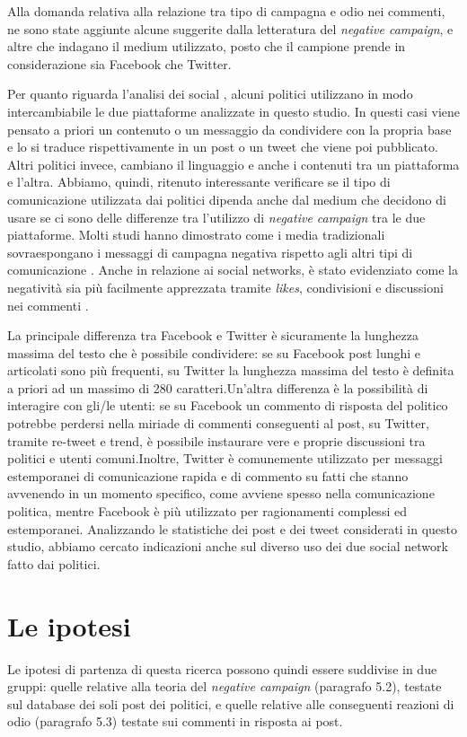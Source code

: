 Alla domanda relativa alla relazione tra tipo di campagna e odio nei commenti, ne sono state aggiunte alcune  suggerite dalla  letteratura del \textit{negative campaign}, e altre che indagano il  medium utilizzato, posto che il campione prende in considerazione sia Facebook che Twitter.

Per quanto riguarda l’analisi dei social , alcuni politici utilizzano in modo intercambiabile le due piattaforme analizzate in questo studio. In questi casi viene pensato a priori un contenuto o un messaggio da condividere con la propria base e lo si traduce rispettivamente in un post o un tweet che viene poi pubblicato. Altri politici invece, cambiano il linguaggio e anche i contenuti tra un piattaforma e l'altra. Abbiamo, quindi,  ritenuto interessante verificare se  il tipo di comunicazione utilizzata dai politici dipenda anche dal medium che decidono di usare se ci sono delle differenze tra l'utilizzo di \textit{negative campaign} tra le due piattaforme. Molti studi hanno dimostrato come i media tradizionali sovraespongano i messaggi di campagna negativa rispetto agli altri tipi di comunicazione \citep{walter2010} \citep{hansen2008} \citep{haselmayer2019}. Anche in relazione ai social networks, è stato evidenziato come la negatività sia più facilmente apprezzata tramite \textit{likes}, condivisioni e discussioni nei commenti \citep{conover2011} \citep{berger2010} \citep{stieglitz2013}. 

La  principale differenza tra Facebook e Twitter è sicuramente la lunghezza massima del testo che è possibile condividere: se su Facebook post lunghi e articolati sono più frequenti, su Twitter la lunghezza massima del testo è definita a priori ad un massimo di 280 caratteri.Un'altra differenza è la possibilità di interagire con gli/le utenti: se su Facebook un commento di risposta del politico potrebbe perdersi nella miriade di commenti conseguenti al post, su Twitter, tramite re-tweet e trend, è possibile instaurare vere e proprie discussioni tra politici e utenti comuni.Inoltre, Twitter è comunemente utilizzato per messaggi estemporanei di comunicazione rapida e di commento su fatti che stanno avvenendo in un momento specifico, come avviene spesso nella comunicazione politica, mentre Facebook è più utilizzato per ragionamenti complessi ed estemporanei. Analizzando le statistiche dei post e dei tweet considerati in questo studio, abbiamo cercato indicazioni anche sul diverso uso dei due social network fatto dai politici.

\section{Le ipotesi}
Le ipotesi di partenza di questa ricerca possono quindi essere suddivise in due gruppi: quelle relative alla teoria del \textit{negative campaign} (paragrafo 5.2), testate sul database dei soli post dei politici, e quelle relative alle conseguenti reazioni di odio (paragrafo 5.3) testate sui commenti in risposta ai post.
\vspace{8pt}\

